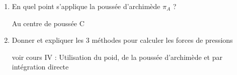 \begin{enumerate}[label=\arabic{enumi} - , left=0pt, itemsep=1em]
\begin{solution}
          \end{solution}

         \item En quel point s'applique la poussée d'archimède $\pi_A$ ? \par
         \begin{solution}
            Au centre de poussée C
          \end{solution}


         \item Donner et expliquer les 3 méthodes pour calculer les forces de pressions \par
         \begin{solution}
            voir cours IV : Utilisation du poid, de la poussée d'archimède et par intégration directe
          \end{solution}
\end{enumerate}
